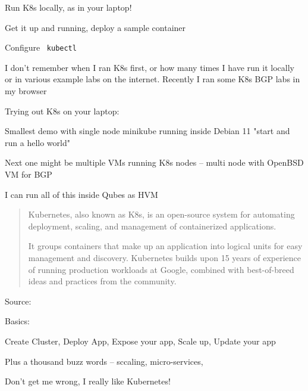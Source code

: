 \documentclass[Screen16to9,17pt]{foils}
\begin{document}



\begin{list2}
\item Run K8s locally, as in your laptop!
\item Get it up and running, deploy a sample container
\item Configure \faWrench\ \verb+kubectl+
\end{list2}

I don't remember when I ran K8s first, or how many times I have run it locally or in various example labs on the internet. Recently I ran some K8s BGP labs in my browser

Trying out K8s on your laptop:

\begin{list2}
\item Smallest demo with single node minikube running inside Debian 11
    "start and run a hello world"
\item Next one might be multiple VMs running K8s nodes -- multi node with OpenBSD VM for BGP
\item I can run all of this inside Qubes as HVM
\end{list2}



\begin{quote}
Kubernetes, also known as K8s, is an open-source system for automating deployment, scaling, and management of containerized applications.

It groups containers that make up an application into logical units for easy management and discovery. Kubernetes builds upon 15 years of experience of running production workloads at Google, combined with best-of-breed ideas and practices from the community.
\end{quote}
Source: 

Basics:
\begin{list2}
\item Create Cluster, Deploy App, Expose your app, Scale up, Update your app

\item Plus a thousand buzz words -- sccaling, micro-services,
\end{list2}

Don't get me wrong, I really like Kubernetes!
\end{document}
